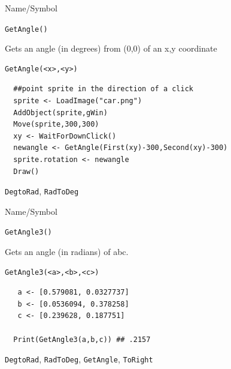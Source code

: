 \begin{desc}{Name/Symbol}
\item[Name/Symbol]	\verb+GetAngle()+

\item[Description]	Gets  an angle (in degrees) from (0,0) of an x,y coordinate


\item[Usage]
\begin{verbatim}
GetAngle(<x>,<y>)
\end{verbatim}

\item[Example]	
\begin{verbatim}
  ##point sprite in the direction of a click   
  sprite <- LoadImage("car.png")
  AddObject(sprite,gWin)
  Move(sprite,300,300)
  xy <- WaitForDownClick()
  newangle <- GetAngle(First(xy)-300,Second(xy)-300)
  sprite.rotation <- newangle
  Draw()
\end{verbatim}

\item[See Also]	\verb+DegtoRad+, \verb+RadToDeg+
\end{desc}


\begin{desc}{Name/Symbol}
\item[Name/Symbol]	\verb+GetAngle3()+

\item[Description]	Gets  an angle (in radians) of abc.


\item[Usage]
\begin{verbatim}
GetAngle3(<a>,<b>,<c>)
\end{verbatim}

\item[Example]	



\begin{verbatim}
   a <- [0.579081, 0.0327737]
   b <- [0.0536094, 0.378258]
   c <- [0.239628, 0.187751]

  Print(GetAngle3(a,b,c)) ## .2157

\end{verbatim}

\item[See Also]	\verb+DegtoRad+, \verb+RadToDeg+, \verb+GetAngle+, \verb+ToRight+
\end{desc}


